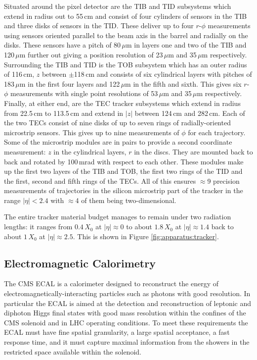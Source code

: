 Situated around the pixel detector are the TIB and TID subsystems which extend in radius out to 55\,cm and consist of four cylinders of sensors in the TIB and three disks of sensors in the TID. These deliver up to four $r$-$\phi$ measurements using sensors oriented parallel to the beam axis in the barrel and radially on the disks. These sensors have a pitch of 80\,$\mu$m in layers one and two of the TIB and 120\,$\mu$m further out giving a position resolution of 23\,$\mu$m and 35\,$\mu$m respectively. 
Surrounding the TIB and TID is the TOB subsystem which has an outer radius of 116\,cm, $z$ between $\pm$118\,cm and consists of six cylindrical layers with pitches of 183\,$\mu$m in the first four layers and 122\,$\mu$m in the fifth and sixth. This gives six $r$-$\phi$ measurements with single point resolutions of 53\,$\mu$m and 35\,$\mu$m respectively. 
Finally, at either end, are the TEC tracker subsystems which extend in radius from 22.5\,cm to 113.5\,cm and extend in $|z|$ between 124\,cm and 282\,cm. Each of the two TECs consist of nine disks of up to seven rings of radially-oriented microstrip sensors. This gives up to nine measurements of $\phi$ for each trajectory.  
Some of the microstrip modules are in pairs to provide a second coordinate measurement: $z$ in the cylindrical layers, $r$ in the discs. They are mounted back to back and rotated by 100\,mrad with respect to each other. These modules make up the first two layers of the TIB and TOB, the first two rings of the TID and the first, second and fifth rings of the TECs.  
All of this ensures $\approx$9 precision measurements of trajectories in the silicon microstrip part of the tracker in the range $|\eta|<2.4$ with $\approx$4 of them being two-dimensional.


The entire tracker material budget manages to remain under two radiation lengths: it ranges from $0.4$\,$X_{0}$ at $|\eta|\approx{0}$ to about $1.8$\,$X_{0}$ at $|\eta|\approx{1.4}$ back to about $1$\,$X_{0}$ at $|\eta|\approx{2.5}$. This is shown in Figure \ref{fig:apparatus:tracker}.


\subsection{Electromagnetic Calorimetry}

The CMS ECAL \cite{CMSEcalTDR} is a calorimeter designed to reconstruct the energy of electromagnetically-interacting particles such as photons with good resolution. In particular the ECAL is aimed at the detection and reconstruction of leptonic and diphoton Higgs final states with good mass resolution within the confines of the CMS solenoid and in LHC operating conditions. To meet these requirements the ECAL must have fine spatial granularity, a large spatial acceptance, a fast response time, and it must capture maximal information from the showers in the restricted space available within the solenoid. 

